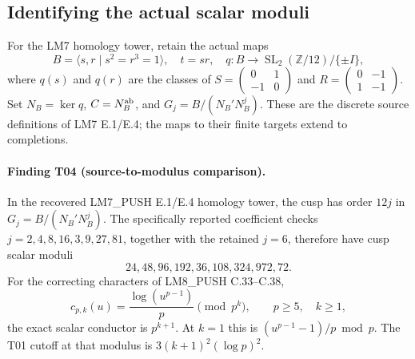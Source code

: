 \subsection{Identifying the actual scalar moduli}

For the LM7 homology tower, retain the actual maps
\[
 B=\langle s,r\mid s^2=r^3=1\rangle,
 \quad t=sr,\quad
 q:B\longrightarrow\operatorname{SL}_2(\mathbb Z/12)/\{\pm I\},
\]
where $q(s)$ and $q(r)$ are the classes of
$S=\left(\begin{smallmatrix}0&1\\-1&0\end{smallmatrix}\right)$ and
$R=\left(\begin{smallmatrix}0&-1\\1&-1\end{smallmatrix}\right)$.
Set $N_B=\ker q$, $C=N_B^{\rm ab}$, and
$G_j=B/(N_B'N_B^j)$. These are the discrete source definitions of
LM7 E.1/E.4; the maps to their finite targets extend to completions.

\paragraph{Finding T04 (source-to-modulus comparison).}
In the recovered LM7\_PUSH E.1/E.4 homology tower, the cusp has order
$12j$ in $G_j=B/(N_B'N_B^j)$. The specifically reported coefficient
checks $j=2,4,8,16,3,9,27,81$, together with the retained $j=6$, therefore
have cusp scalar moduli
\[
        24,48,96,192,36,108,324,972,72.
 \tag{T04.1}
\]
For the correcting characters of LM8\_PUSH C.33--C.38,
\[
 c_{p,k}(u)=\frac{\log(u^{p-1})}{p}\pmod{p^k},
 \qquad p\geq5,\quad k\geq1,
 \tag{T04.2}
\]
the exact scalar conductor is $p^{k+1}$. At $k=1$ this is
$(u^{p-1}-1)/p\bmod p$. The T01 cutoff at that modulus is
$3(k+1)^2(\log p)^2$.

